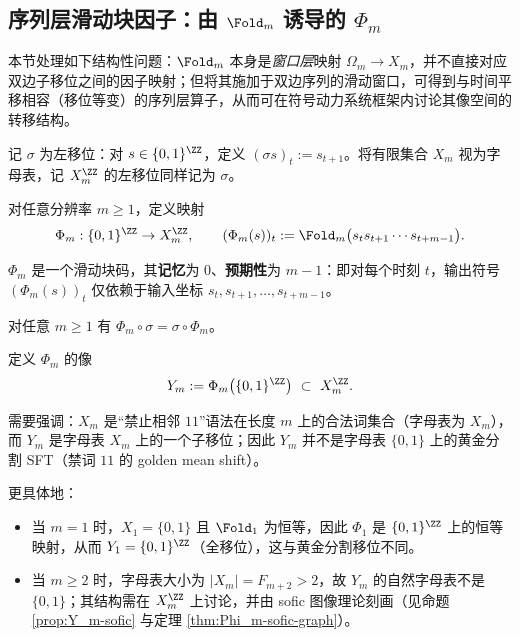 \subsection{序列层滑动块因子：由 \texorpdfstring{$\Fold_m$}{Fold\_m} 诱导的 \texorpdfstring{$\Phi_m$}{Phi\_m}}

本节处理如下结构性问题：$\Fold_m$ 本身是\emph{窗口层}映射 $\Omega_m\to X_m$，并不直接对应双边子移位之间的因子映射；但将其施加于双边序列的滑动窗口，可得到与时间平移相容（移位等变）的序列层算子，从而可在符号动力系统框架内讨论其像空间的转移结构。

记 $\sigma$ 为左移位：对 $s\in\{0,1\}^{\ZZ}$，定义 $(\sigma s)_t:=s_{t+1}$。将有限集合 $X_m$ 视为字母表，记 $X_m^{\ZZ}$ 的左移位同样记为 $\sigma$。

\begin{definition}\label{def:Phi_m}
对任意分辨率 $m\ge 1$，定义映射
\[
\Phi_m:\{0,1\}^{\ZZ}\to X_m^{\ZZ},\qquad
(\Phi_m(s))_t:=\Fold_m\bigl(s_t s_{t+1}\cdots s_{t+m-1}\bigr).
\]
\end{definition}

\begin{proposition}\label{prop:Phi_m-radius}
$\Phi_m$ 是一个滑动块码，其\textbf{记忆}为 $0$、\textbf{预期性}为 $m-1$：即对每个时刻 $t$，输出符号 $(\Phi_m(s))_t$ 仅依赖于输入坐标
\(
s_t,s_{t+1},\dots,s_{t+m-1}
\)。
\end{proposition}

\begin{proposition}\label{prop:Phi_m-equivariant}
对任意 $m\ge 1$ 有 $\Phi_m\circ\sigma=\sigma\circ\Phi_m$。
\end{proposition}

\begin{definition}[像空间]\label{def:Y_m}
定义 $\Phi_m$ 的像
\[
Y_m:=\Phi_m\bigl(\{0,1\}^{\ZZ}\bigr)\ \subset\ X_m^{\ZZ}.
\]
\end{definition}

\begin{remark}\label{rem:Ym-not-golden-mean}
需要强调：$X_m$ 是“禁止相邻 $11$”语法在长度 $m$ 上的合法词集合（字母表为 $X_m$），而 $Y_m$ 是字母表 $X_m$ 上的一个子移位；因此 $Y_m$ 并不是字母表 $\{0,1\}$ 上的黄金分割 SFT（禁词 $11$ 的 golden mean shift）。

更具体地：
\begin{itemize}
  \item 当 $m=1$ 时，$X_1=\{0,1\}$ 且 $\Fold_1$ 为恒等，因此 $\Phi_1$ 是 $\{0,1\}^{\ZZ}$ 上的恒等映射，从而 $Y_1=\{0,1\}^{\ZZ}$（全移位），这与黄金分割移位不同。
  \item 当 $m\ge 2$ 时，字母表大小为 $|X_m|=F_{m+2}>2$，故 $Y_m$ 的自然字母表不是 $\{0,1\}$；其结构需在 $X_m^{\ZZ}$ 上讨论，并由 sofic 图像理论刻画（见命题 \ref{prop:Y_m-sofic} 与定理 \ref{thm:Phi_m-sofic-graph}）。
\end{itemize}
\end{remark}

